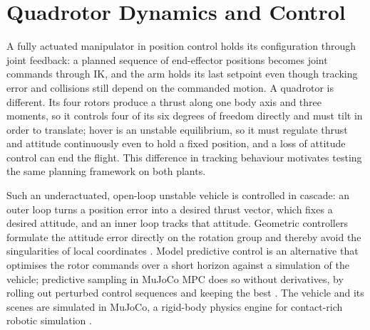 \section{Quadrotor Dynamics and Control}\label{sec:bg:quadrotor}

A fully actuated manipulator in position control holds its configuration through joint feedback: a
planned sequence of end-effector positions becomes joint commands through \ac{IK}, and the arm holds
its last setpoint even though tracking error and collisions still depend on the commanded motion. A
quadrotor is different. Its four rotors produce a thrust along one body axis and three moments, so it
controls four of its six degrees of freedom directly and must tilt in order to translate; hover is an
unstable equilibrium, so it must regulate thrust and attitude continuously even to hold a fixed position,
and a loss of attitude control can end the flight. This difference in tracking behaviour motivates
testing the same planning framework on both plants.

Such an underactuated, open-loop unstable vehicle is
controlled in cascade: an outer loop turns a position error into a desired thrust vector, which fixes a
desired attitude, and an inner loop tracks that attitude. Geometric controllers formulate the attitude
error directly on the rotation group and thereby avoid the singularities of local coordinates
\parencite{lee2010geometric}. Model predictive control is an alternative that optimises the rotor
commands over a short horizon against a simulation of the vehicle; predictive sampling in MuJoCo MPC
does so without derivatives, by rolling out perturbed control sequences and keeping the best
\parencite{howell2022predictive}. The vehicle and its scenes are simulated in MuJoCo, a rigid-body
physics engine for contact-rich robotic simulation \parencite{todorov2012mujoco}.
